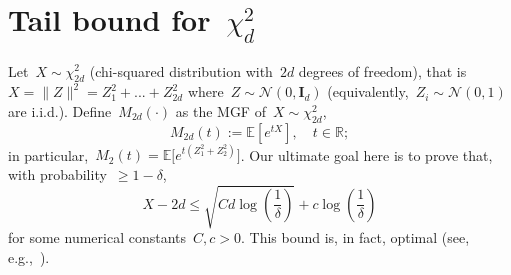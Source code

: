 \documentclass[11pt]{article}
\newcommand{\R}{\mathds{R}}
\newcommand{\E}{\mathds{E}}
\newcommand{\cN}{\mathcal{N}}
\newcommand{\bId}{\boldsymbol{I}}
\newcommand{\leqs}{\leqslant}
\newcommand{\geqs}{\geqslant}
\renewcommand{\le}{\leqs}
\renewcommand{\ge}{\geqs}
\begin{document}
\newpage
\noindent
\section{Tail bound for~$\chi^2_d$}

Let~$X \sim \chi_{2d}^2$ (chi-squared distribution with~$2d$ degrees of freedom), that is~$X = \|Z\|^2 = Z_1^2 + ... + Z_{2d}^2$ where~$Z \sim \cN(0,\bId_d)$ (equivalently,~$Z_i \sim \cN(0,1)$ are {i.i.d.}).
Define~$M_{2d}(\cdot)$ as the MGF of~$X \sim \chi_{2d}^2$, 
\[
M_{2d}(t) := \E[e^{tX}], \quad t \in \R;
\] 
in particular,~$M_2(t) = \E \big[e^{t (Z_1^2 + Z_2^2)} \big]$. 
Our ultimate goal here is to prove that, with probability~$\ge 1-\delta$,
\begin{equation}
\label{eq:chi-squared-upper}
X - 2d \le \sqrt{Cd\log\left(\frac{1}{\delta} \right)} + c \log \left(\frac{1}{\delta}\right)
\end{equation}
for some numerical constants~$C,c > 0$. This bound is, in fact, optimal (see, e.g.,~\cite[Lemma~1]{lama2000}).
\end{document}
